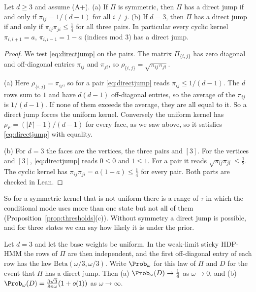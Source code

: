 \begin{corollary}\label{cor:uniform-kernel}
Let $d\ge3$ and assume \textup{(A+)}. \textup{(a)} If $\Pi$ is symmetric,
then $\Pi$ has a direct jump if and only if $\pi_{ij}=1/(d-1)$ for all
$i\ne j$. \textup{(b)} If $d=3$, then $\Pi$ has a direct jump if and only if
$\pi_{ij}\pi_{ji}\le\frac14$ for all three pairs. In particular every cyclic
kernel $\pi_{i,i+1}=a$, $\pi_{i,i-1}=1-a$ (indices mod $3$) has a direct
jump.
\end{corollary}

\begin{proof}
We test \eqref{eq:directjump} on the pairs. The matrix $\Pi_{\{i,j\}}$ has
zero diagonal and off-diagonal entries $\pi_{ij}$ and $\pi_{ji}$, so
$\rho_{\{i,j\}}=\sqrt{\pi_{ij}\pi_{ji}}$.

(a) Here $\rho_{\{i,j\}}=\pi_{ij}$, so for a pair \eqref{eq:directjump} reads
$\pi_{ij}\le1/(d-1)$. The $d$ rows sum to $1$ and have $d(d-1)$ off-diagonal
entries, so the average of the $\pi_{ij}$ is $1/(d-1)$. If none of them
exceeds the average, they are all equal to it. So a direct jump forces the
uniform kernel. Conversely the uniform kernel has $\rho_F=(|F|-1)/(d-1)$ for
every face, as we saw above, so it satisfies \eqref{eq:directjump} with
equality.

(b) For $d=3$ the faces are the vertices, the three pairs and $[3]$. For the
vertices and $[3]$, \eqref{eq:directjump} reads $0\le0$ and $1\le1$. For a
pair it reads $\sqrt{\pi_{ij}\pi_{ji}}\le\frac12$. The cyclic kernel has
$\pi_{ij}\pi_{ji}=a(1-a)\le\frac14$ for every pair. Both parts are checked in
Lean.
\end{proof}

So for a symmetric kernel that is not uniform there is a range of $\tau$ in
which the conditional mode uses more than one state but not all of them
(Proposition~\ref{prop:thresholds}(c)). Without symmetry a direct jump is
possible, and for three states we can say how likely it is under the prior.

\begin{proposition}\label{prop:directjump}
Let $d=3$ and let the base weights be uniform. In the weak-limit sticky
HDP-HMM the rows of $\Pi$ are then independent, and the first off-diagonal
entry of each row has the law $\mathrm{Beta}(\omega/3,\omega/3)$. Write
$\Prob_\omega$ for this law of $\Pi$ and $D$ for the event that $\Pi$ has a
direct jump. Then \textup{(a)} $\Prob_\omega(D)\to\frac14$ as $\omega\to0$,
and \textup{(b)} $\Prob_\omega(D)=\frac{3\sqrt3}{8\pi\omega}(1+o(1))$ as
$\omega\to\infty$.
\end{proposition}

